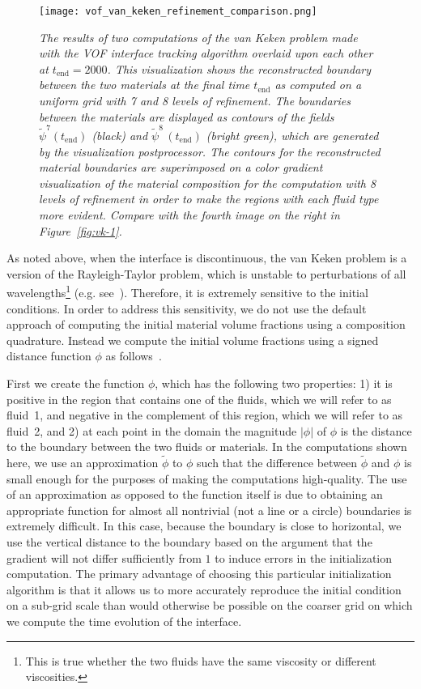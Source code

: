 \begin{figure}
    \centering
    \texttt{[image: vof\_van\_keken\_refinement\_comparison.png]}
    \caption{\it The results of two computations of the van Keken problem made with the VOF 
        interface tracking algorithm overlaid upon each other at $t_\text{end}=2000$.
        This visualization shows the reconstructed boundary between the two
        materials at the final time $t_\text{end}$ as computed on a uniform grid
        with 7 and 8 levels of refinement.
        The boundaries between the materials are displayed as contours
        of the fields $\tilde{\psi}^7(t_\text{end})$ (black) and
        $\tilde{\psi}^8\,(t_\text{end})$ (bright green), which are generated by the  visualization postprocessor.
        The contours for the reconstructed material boundaries are superimposed
        on a color gradient visualization of the material composition for the
        computation with 8 levels of refinement in order to make the regions
        with each fluid type more evident.
        Compare with the fourth image on the right in Figure~\ref{fig:vk-1}.
    }
    \label{fig:VOF_van_Keken-02}
\end{figure}

As noted above, when the interface is discontinuous, the van Keken problem is a version 
of the Rayleigh-Taylor problem, which is unstable to perturbations of all 
wavelengths\footnote{This is true whether the two fluids have the same viscosity or different 
viscosities.} (e.g. see~\cite{SC:1961}).
Therefore, it is extremely sensitive to the initial conditions.
In order to address this sensitivity, we do not use  the default approach of
computing the initial material volume fractions using a composition quadrature.
Instead we compute the initial volume fractions using a signed distance
function $\phi$ as follows~\cite{JMR:2019,JMR-EGP:2019}.

First we create the function $\phi$, which has the following two properties: 1) it is positive 
in the region that contains one of the fluids, which we will refer to as fluid~1, and negative 
in the complement of this region, which we will refer to as fluid~2, and 2) at each point in 
the domain the magnitude $| \phi |$ of $\phi$ is the distance to the boundary between the 
two fluids or materials.
In the computations shown here, we use an approximation $\tilde{\phi}$ to $\phi$ such that the
difference between $\tilde{\phi}$ and $\phi$ is small enough for the purposes of making the 
computations high-quality.
The use of an approximation as opposed to the function itself is due to obtaining an appropriate function for almost all nontrivial (not a line or a circle) boundaries is extremely difficult.
In this case, because the boundary is close to horizontal, we use the vertical distance to the boundary based on the argument that the gradient will not differ sufficiently from $1$ to induce errors in the initialization computation.
The primary advantage of choosing this particular initialization algorithm is that it allows us 
to more accurately reproduce the initial condition on a sub-grid scale than would otherwise be 
possible on the coarser grid on which we compute the time evolution of the interface. 


